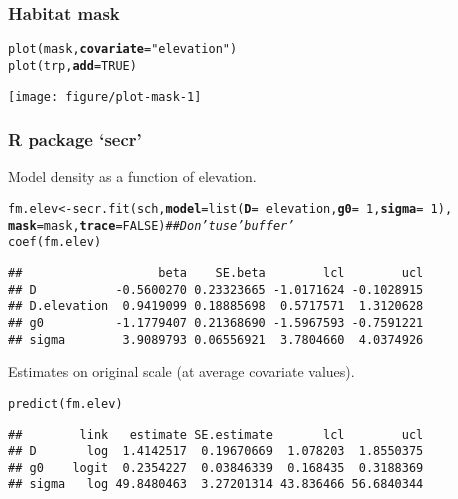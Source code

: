 \documentclass[color=usenames,dvipsnames]{beamer}\usepackage[]{graphicx}\usepackage[]{color}
\makeatletter
\newcommand{\hlnum}[1]{\textcolor[rgb]{0.69,0.494,0}{#1}}%
\newcommand{\hlstr}[1]{\textcolor[rgb]{0.749,0.012,0.012}{#1}}%
\newcommand{\hlcom}[1]{\textcolor[rgb]{0.514,0.506,0.514}{\textit{#1}}}%
\newcommand{\hlopt}[1]{\textcolor[rgb]{0,0,0}{#1}}%
\newcommand{\hlstd}[1]{\textcolor[rgb]{0,0,0}{#1}}%
\newcommand{\hlkwb}[1]{\textcolor[rgb]{0,0.341,0.682}{#1}}%
\newcommand{\hlkwc}[1]{\textcolor[rgb]{0,0,0}{\textbf{#1}}}%
\newcommand{\hlkwd}[1]{\textcolor[rgb]{0.004,0.004,0.506}{#1}}%
\newenvironment{kframe}{%
 \def\at@end@of@kframe{}%
 \ifinner\ifhmode%
  \def\at@end@of@kframe{\end{minipage}}%
  \begin{minipage}{\columnwidth}%
 \fi\fi%
 \def\FrameCommand##1{\hskip\@totalleftmargin \hskip-\fboxsep
 \colorbox{shadecolor}{##1}\hskip-\fboxsep
     \hskip-\linewidth \hskip-\@totalleftmargin \hskip\columnwidth}%
 \MakeFramed {\advance\hsize-\width
   \@totalleftmargin\z@ \linewidth\hsize
   \@setminipage}}%
 {\par\unskip\endMakeFramed%
 \at@end@of@kframe}
\newenvironment{knitrout}{}{} %
\makeatother
\begin{document}
\begin{frame}[fragile]
  \frametitle{Habitat mask}
\begin{knitrout}\scriptsize
{}\color{fgcolor}\begin{kframe}
\begin{alltt}
\hlkwd{plot}\hlstd{(mask,} \hlkwc{covariate}\hlstd{=}\hlstr{"elevation"}\hlstd{)}
\hlkwd{plot}\hlstd{(trp,} \hlkwc{add}\hlstd{=}\hlnum{TRUE}\hlstd{)}
\end{alltt}
\end{kframe}

{\centering \texttt{[image: figure/plot-mask-1]} 

}



\end{knitrout}
\end{frame}




\begin{frame}[fragile]
  \frametitle{R package `secr'}
  Model density as a function of elevation. 
\begin{knitrout}\scriptsize
{}\color{fgcolor}\begin{kframe}
\begin{alltt}
\hlstd{fm.elev} \hlkwb{<-} \hlkwd{secr.fit}\hlstd{(sch,} \hlkwc{model}\hlstd{=}\hlkwd{list}\hlstd{(}\hlkwc{D}\hlstd{=}\hlopt{~}\hlstd{elevation,} \hlkwc{g0}\hlstd{=}\hlopt{~}\hlnum{1}\hlstd{,} \hlkwc{sigma}\hlstd{=}\hlopt{~}\hlnum{1}\hlstd{),}
                    \hlkwc{mask}\hlstd{=mask,} \hlkwc{trace}\hlstd{=}\hlnum{FALSE}\hlstd{)}  \hlcom{## Don't use 'buffer'}
\hlkwd{coef}\hlstd{(fm.elev)}
\end{alltt}
\begin{verbatim}
##                   beta    SE.beta        lcl        ucl
## D           -0.5600270 0.23323665 -1.0171624 -0.1028915
## D.elevation  0.9419099 0.18885698  0.5717571  1.3120628
## g0          -1.1779407 0.21368690 -1.5967593 -0.7591221
## sigma        3.9089793 0.06556921  3.7804660  4.0374926
\end{verbatim}
\end{kframe}
\end{knitrout}
\pause
\vfill
Estimates on original scale (at average covariate values).
\begin{knitrout}\scriptsize
{}\color{fgcolor}\begin{kframe}
\begin{alltt}
\hlkwd{predict}\hlstd{(fm.elev)}
\end{alltt}
\begin{verbatim}
##        link   estimate SE.estimate       lcl        ucl
## D       log  1.4142517  0.19670669  1.078203  1.8550375
## g0    logit  0.2354227  0.03846339  0.168435  0.3188369
## sigma   log 49.8480463  3.27201314 43.836466 56.6840344
\end{verbatim}
\end{kframe}
\end{knitrout}
\end{frame}
\end{document}
